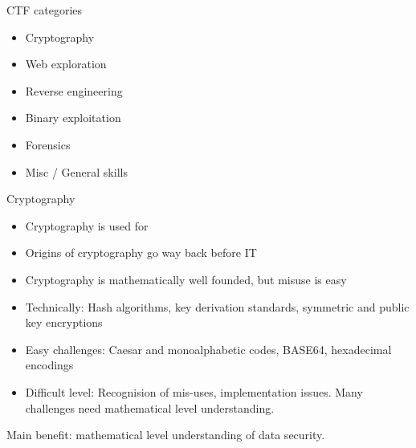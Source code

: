 \documentclass[12 pt]{beamer}
\begin{document}
\begin{frame}{CTF categories}

    \begin{itemize}
      \item{Cryptography}

      \bigskip

      \item{Web exploration}

      \bigskip

      \item{Reverse engineering}

      \bigskip

      \item{Binary exploitation}

      \bigskip

      \item{Forensics}

      \bigskip

      \item{Misc / General skills}
    \end{itemize}

\end{frame}


\begin{frame}{Cryptography}

  \begin{itemize}
    \item{Cryptography is used for }
    \item{Origins of cryptography go way back before IT}
    \item{Cryptography is mathematically well founded, but misuse is easy}
    \item{Technically: Hash algorithms, key derivation standards, symmetric and public key encryptions}
    \item{Easy challenges: Caesar and monoalphabetic codes, BASE64, hexadecimal encodings}
    \item{Difficult level: Recognision of mis-uses, implementation issues. Many challenges need mathematical level understanding.}
  \end{itemize}

  \begin{exampleblock}{}
    Main benefit: mathematical level understanding of data security.
  \end{exampleblock}

\end{frame}
\end{document}
